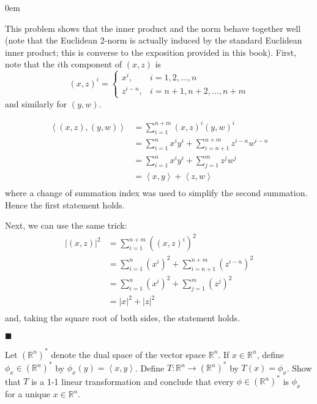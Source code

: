 \documentclass[12pt]{article}
\renewcommand{\qed}{\hfill$\blacksquare$}
\renewenvironment{proof}{\begin{addmargin}[1em]{0em}\begin{newproof}}{\end{newproof}\end{addmargin}\qed}
\newenvironment{problem}[2][Problem]{\begin{trivlist}
\item[\hskip \labelsep {\bfseries #1}\hskip \labelsep {\bfseries #2.}]}{\end{trivlist}}
\begin{document}
\begin{proof}
This problem shows that the inner product and the norm behave together well (note that the Euclidean 2-norm is actually induced by the standard Euclidean inner product; this is converse to the exposition provided in this book). First, note that the $i$th component of $\left(x,z\right)$ is
\begin{equation*}
\left(x,z\right)^i = \left\{ \begin{array}{lr}
x^i, & i=1,2,\ldots,n \\
z^{i-n}, & i = n+1,n+2,\ldots,n+m
\end{array} \right.
\end{equation*}
and similarly for $\left(y,w\right)$.

\begin{equation*}
\begin{split}
\left\langle \left(x,z\right),\left(y,w\right) \right\rangle & = \sum_{i=1}^{n+m} \left(x,z\right)^i \left(y,w\right)^i \\
& = \sum_{i=1}^n x^i y^i + \sum_{i=n+1}^{n+m} z^{i-n} w^{i-n} \\
& = \sum_{i=1}^n x^i y^i + \sum_{j=1}^m z^j w^j \\
& = \left\langle x, y\right\rangle + \left\langle z,w\right\rangle \\
\end{split}
\end{equation*}
where a change of summation index was used to simplify the second summation. Hence the first statement holds.

Next, we can use the same trick:
\begin{equation*}
\begin{split}
\left| \left(x,z\right)\right|^2 & = \sum_{i=1}^{n+m} \left(\left(x,z\right)^i\right)^2 \\
& = \sum_{i=1}^n \left(x^i\right)^2 + \sum_{i=n+1}^{n+m} \left(z^{i-n}\right)^2 \\
& = \sum_{i=1}^n \left(x^i\right)^2 + \sum_{j=1}^m \left(z^j\right)^2 \\
& = \left|x\right|^2 + \left|z\right|^2 \\
\end{split}
\end{equation*}
and, taking the square root of both sides, the statement holds.
\end{proof}
 
 
 
 \begin{problem}{1.12} Let $\left(\mathbb{R}^n\right)^*$ denote the dual space of the vector space $\mathbb{R}^n$. If $x\in\mathbb{R}^n$, define $\phi_x \in \left(\mathbb{R}^n\right)^*$ by $\phi_x \left(y\right) = \left\langle x, y\right\rangle$. Define $T:\mathbb{R}^n \rightarrow \left(\mathbb{R}^n\right)^*$ by $T\left(x\right) = \phi_x$. Show that $T$ is a 1-1 linear transformation and conclude that every $\phi \in \left(\mathbb{R}^n\right)^*$ is $\phi_x$ for a unique $x\in \mathbb{R}^n$.
\end{problem}
 
\end{document}
